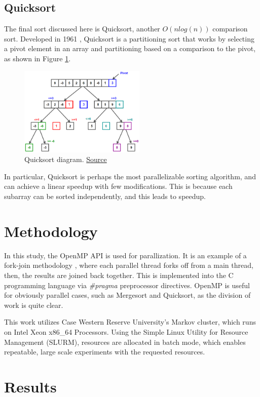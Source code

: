 \documentclass[conference]{IEEEtran}
\begin{document}
\subsection{Quicksort}
The final sort discussed here is Quicksort, another $O(n log(n))$ comparison sort. 
Developed in 1961 \cite{hoare_algorithm_1961}, Quicksort is a partitioning sort that works by selecting a pivot element in an array and partitioning based on a comparison to the pivot, as shown in Figure \ref{qck}. 
\begin{figure}[h]
	\includegraphics[width=6cm]{Quicksort.png} 
	\caption{Quicksort diagram. \href{https://www.techiedelight.com/quicksort/}{Source}}
	\label{qck}
\end{figure}
In particular, Quicksort is perhaps the most parallelizable sorting algorithm, and can achieve a linear speedup with few modifications. \cite{blelloch_programming_1996}
This is because each subarray can be sorted independently, and this leads to speedup. 
\section{Methodology}
In this study, the OpenMP \cite{openmp08} API is used for parallization. 
It is an example of a fork-join methodology	, where each parallel thread forks off from a main thread, then, the results are joined back together. 
This is implemented into the C programming language via \textit{\#pragma} preprocessor directives. 
OpenMP is useful for obviously parallel cases, such as Mergesort and Quicksort, as the division of work is quite clear. 

This work utilizes Case Western Reserve University's Markov cluster, which runs on Intel Xeon x86\_64 Processors. 
Using the Simple Linux Utility for Resource Management \cite{yoo_slurm_2003} (SLURM), resources are allocated in batch mode, which enables repeatable, large scale experiments with the requested resources. 

\section{Results}
\end{document}
